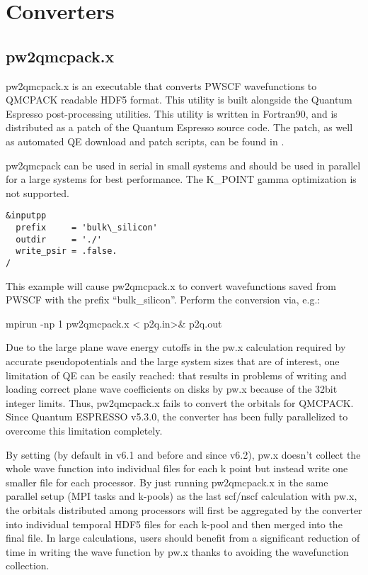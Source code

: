 \section{Converters} 
    
  \subsection{pw2qmcpack.x}
\label{sec:pw2qmcpack}
pw2qmcpack.x is an executable that converts PWSCF wavefunctions to QMCPACK readable 
HDF5 format.  This utility is built alongside the Quantum Espresso post-processing utilities.
This utility is written in Fortran90, and is distributed as a patch of the Quantum Espresso 
source code.  The patch, as well as automated QE download and patch scripts, can be found in 
.

pw2qmcpack can be used in serial in small systems and should be used in parallel for a large systems for best performance. The K\_POINT gamma optimization is not supported.

\begin{lstlisting}[caption={Sample \ishell{pw2qmcpack.x} input file \ishell{p2q.in}}]
&inputpp
  prefix     = 'bulk\_silicon'
  outdir     = './'
  write_psir = .false.
/
\end{lstlisting}

This example will cause pw2qmcpack.x to convert wavefunctions saved from PWSCF with the prefix ``bulk\_silicon''. Perform the conversion via, e.g.:

\begin{shade}
mpirun -np 1 pw2qmcpack.x < p2q.in>& p2q.out
\end{shade}

Due to the large plane wave energy cutoffs in the pw.x calculation required by accurate pseudopotentials and the large system sizes that are of interest, one limitation of QE can be easily reached:
that  results in problems of writing and loading correct plane wave coefficients on disks by pw.x because of the 32bit integer limits. Thus, pw2qmcpack.x fails to convert the orbitals for QMCPACK. Since Quantum ESPRESSO v5.3.0, the converter has been fully parallelized to overcome this limitation completely.

By setting  (by default  in v6.1 and before and  since v6.2), pw.x doesn't collect the whole wave function into individual files for each k point but instead write one smaller file for each processor.
By just running pw2qmcpack.x in the same parallel setup (MPI tasks and k-pools) as the last scf/nscf calculation with pw.x,
the orbitals distributed among processors will first be aggregated by the converter into individual temporal HDF5 files for each k-pool and then merged into the final file.
In large calculations, users should benefit from a significant reduction of time in writing the wave function by pw.x thanks to avoiding the wavefunction collection.

